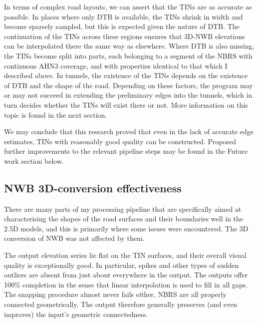 In terms of complex road layouts, we can assert that the TINs are as accurate as possible. In places where only DTB is available, the TINs shrink in width and become sparsely sampled, but this is expected given the nature of DTB. The continuation of the TINs across these regions ensures that 3D-NWB elevations can be interpolated there the same way as elsewhere. Where DTB is also missing, the TINs become split into parts, each belonging to a segment of the NBRS with continuous AHN3 coverage, and with properties identical to that which I described above. In tunnels, the existence of the TINs depends on the existence of DTB and the shape of the road. Depending on these factors, the program may or may not succeed in extending the preliminary edges into the tunnels, which in turn decides whether the TINs will exist there or not. More information on this topic is found in the next section.

We may conclude that this research proved that even in the lack of accurate edge estimates, TINs with reasonably good quality can be constructed. Proposed further improvements to the relevant pipeline steps may be found in the Future work section below.

\subsection{NWB 3D-conversion effectiveness}
\label{sub:effectivenessconversion}

There are many parts of my processing pipeline that are specifically aimed at characterising the shapes of the road surfaces and their boundaries well in the 2.5D models, and this is primarily where some issues were encountered. The 3D conversion of NWB was not affected by them.

The output elevation series lie flat on the TIN surfaces, and their overall visual quality is exceptionally good. In particular, spikes and other types of sudden outliers are absent from just about everywhere in the output. The outputs offer 100\% completion in the sense that linear interpolation is used to fill in all gaps. The snapping procedure almost never fails either, NBRS are all properly connected geometrically. The output therefore generally preserves (and even improves) the input's geometric connectedness.

